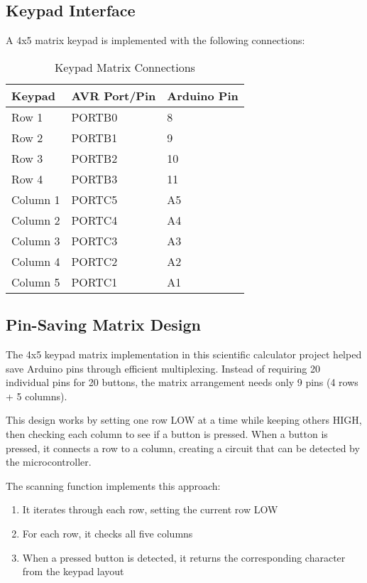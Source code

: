 \documentclass{article}
\begin{document}
\subsection{Keypad Interface}
A 4x5 matrix keypad is implemented with the following connections:

\begin{table}[h]
\centering
\begin{tabular}{|l|l|l|}
\hline
\textbf{Keypad} & \textbf{AVR Port/Pin} & \textbf{Arduino Pin} \\
\hline
Row 1 & PORTB0 & 8 \\
\hline
Row 2 & PORTB1 & 9 \\
\hline
Row 3 & PORTB2 & 10 \\
\hline
Row 4 & PORTB3 & 11 \\
\hline
Column 1 & PORTC5 & A5 \\
\hline
Column 2 & PORTC4 & A4 \\
\hline
Column 3 & PORTC3 & A3 \\
\hline
Column 4 & PORTC2 & A2 \\
\hline
Column 5 & PORTC1 & A1 \\
\hline
\end{tabular}
\caption{Keypad Matrix Connections}
\end{table}

\subsection{Pin-Saving Matrix Design}
The 4x5 keypad matrix implementation in this scientific calculator project helped save Arduino pins through efficient multiplexing. Instead of requiring 20 individual pins for 20 buttons, the matrix arrangement needs only 9 pins (4 rows + 5 columns).

This design works by setting one row LOW at a time while keeping others HIGH, then checking each column to see if a button is pressed. When a button is pressed, it connects a row to a column, creating a circuit that can be detected by the microcontroller.

The scanning function implements this approach:
\begin{enumerate}
    \item It iterates through each row, setting the current row LOW
    \item For each row, it checks all five columns
    \item When a pressed button is detected, it returns the corresponding character from the keypad layout
\end{enumerate}
\end{document}
